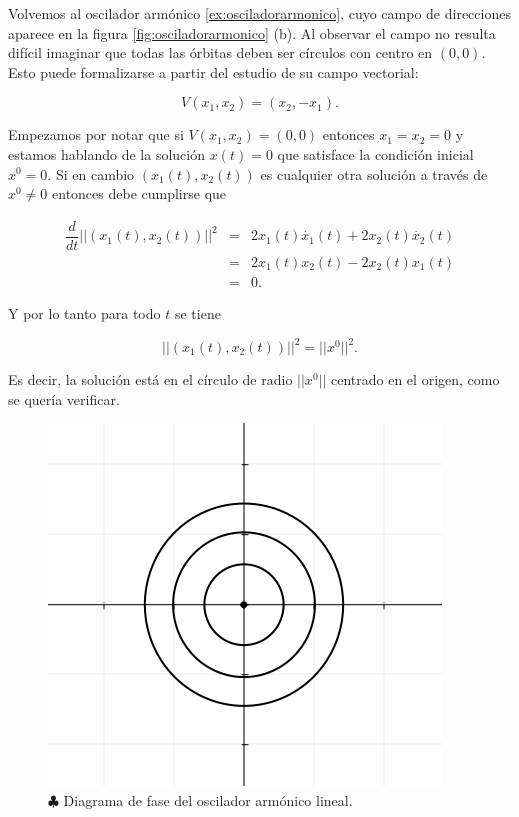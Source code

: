 \begin{example} \label{ej:sistemahiperbolas}
Volvemos al oscilador armónico \ref{ex:osciladorarmonico}, cuyo campo de direcciones aparece en la figura \ref{fig:osciladorarmonico} (b).
Al observar el campo no resulta difícil imaginar que todas las órbitas deben ser círculos con centro en $(0,0)$. Esto puede formalizarse a partir del estudio de su campo vectorial:

$$ V(x_1,x_2) = (x_2, -x_1). $$

Empezamos por notar que si $V(x_1,x_2) = (0,0)$ entonces $x_1 = x_2 = 0$ y estamos hablando de la solución $x(t) = 0$ que satisface la condición inicial $x^0 = 0$. Si en cambio $(x_1(t),x_2(t))$ es cualquier otra solución a través de $x^0 \neq 0$ entonces debe cumplirse que 

$$
\begin{array}{ccl}
	\dfrac{d}{dt} || (x_1(t),x_2(t))  ||^2 & = & 2x_1(t)\dot{x_1}(t) + 2x_2(t)\dot{x_2}(t) \\
									   & = & 2x_1(t)x_2(t) - 2x_2(t)x_1(t) \\
									   & = & 0.
\end{array}
$$

Y por lo tanto para todo $t$ se tiene

$$ ||(x_1(t), x_2(t))||^2 = ||x^0||^2. $$

Es decir, la solución está en el círculo de radio $||x^0||$ centrado en el origen, como se quería verificar.
\end{example}

\begin{figure}[h] \centering
    \includegraphics[scale=0.5]{figures/osciladorarmonico-diagramafase.png}
    \caption{$\clubsuit$ Diagrama de fase del oscilador armónico lineal.}
\end{figure}


